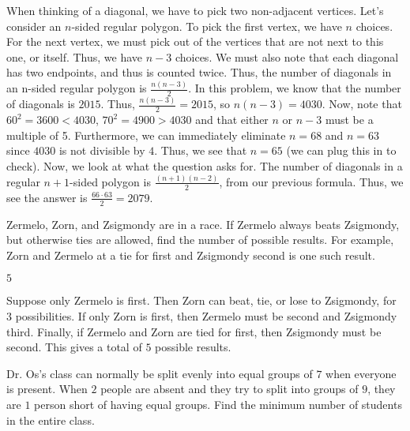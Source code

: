 \documentclass[11pt]{article}
\begin{document}
\begin{solution}
When thinking of a diagonal, we have to pick two non-adjacent vertices. Let's consider an $n$-sided regular polygon. To pick the first vertex, we have $n$ choices. For the next vertex, we must pick out of the vertices that are not next to this one, or itself. Thus, we have $n-3$ choices. We must also note that each diagonal has two endpoints, and thus is counted twice. Thus, the number of diagonals in an n-sided regular polygon is $\frac{n(n-3)}{2}$. In this problem, we know that the number of diagonals is $2015$. Thus, $\frac{n(n-3)}{2} = 2015$, so $n(n-3) = 4030$. Now, note that $60^2 = 3600 < 4030$, $70^2 = 4900 > 4030$ and that either $n$ or $n-3$ must be a multiple of 5. Furthermore, we can immediately eliminate $n = 68$ and $n = 63$ since $4030$ is not divisible by $4$. Thus, we see that $n = 65$ (we can plug this in to check). Now, we look at what the question asks for. The number of diagonals in a regular $n+1$-sided polygon is $\frac{(n+1)(n-2)}{2}$, from our previous formula. Thus, we see the answer is $\frac{66 \cdot 63}{2} = 2079$.
\end{solution}


\begin{problem}
Zermelo, Zorn, and Zsigmondy are in a race. If Zermelo always beats Zsigmondy, but otherwise ties are allowed, find the number of possible results. For example, Zorn and Zermelo at a tie for first and Zsigmondy second is one such result.
\end{problem}

\begin{answer}
$\boxed{5}$
\end{answer}

\begin{solution}
Suppose only Zermelo is first. Then Zorn can beat, tie, or lose to Zsigmondy, for $3$ possibilities. If only Zorn is first, then Zermelo must be second and Zsigmondy third. Finally, if Zermelo and Zorn are tied for first, then Zsigmondy must be second. This gives a total of $\boxed{5}$ possible results.
\end{solution}


\begin{problem}
Dr. Os's class can normally be split evenly into equal groups of $7$ when everyone is present. When $2$ people are absent and they try to split into groups of $9$, they are $1$ person short of having equal groups. Find the minimum number of students in the entire class.
\end{problem}
\end{document}
